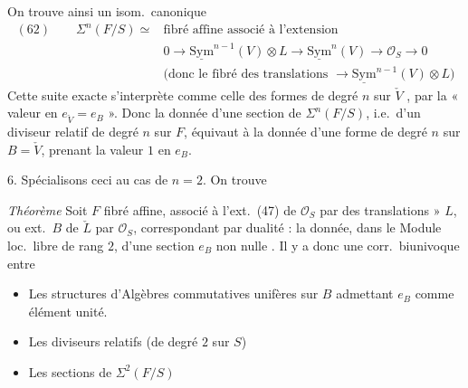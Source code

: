 \documentclass[11pt,a4paper]{article}
\begin{document}


On trouve ainsi un isom.\ canonique
\[
\begin{aligned}
(62)\qquad \Sigma^n(F/S) \simeq{} & \text{fibré affine associé à l'extension}\\
& 0 \to \underline{\mathrm{Sym}}^{n-1}(V) \otimes L \to \underline{\mathrm{Sym}}^n(V) \to \mathcal{O}_S \to 0\\
& \bigl(\text{donc le fibré des translations } \to \underline{\mathrm{Sym}}^{n-1}(V) \otimes L\bigr)
\end{aligned}
\]
Cette suite exacte s'interprète comme celle  des formes de degré $n$ sur $\check{V}$  , par la « valeur en $e_{\check{V}} = e_B$ ». Donc la donnée d'une section de $\Sigma^n(F/S)$, i.e.\ d'un diviseur relatif de degré $n$ sur $F$, équivaut à la donnée d'une forme de degré $n$ sur $B = \check{V}$, prenant la valeur $1$ en $e_B$.

6. Spécialisons ceci au cas de $n = 2$. On trouve

\emph{Théorème} Soit $F$ fibré affine, associé à l'ext.\ (47) de $\mathcal{O}_S$ par   des translations » $L$, ou ext.\ $B$ de $\check{L}$ par $\mathcal{O}_S$, correspondant par dualité : la donnée, dans le Module loc.\ libre  de rang $2$, d'une section $e_B$ non nulle . Il y a donc une corr.\ biunivoque entre
\begin{itemize}
\item[a)] Les structures d'Algèbres commutatives unifères sur $B$ admettant $e_B$ comme élément unité.
\item[b)] Les diviseurs relatifs  (de degré $2$ sur $S$)
\item[c)] Les sections de $\Sigma^2(F/S)$
\end{itemize}
\end{document}
